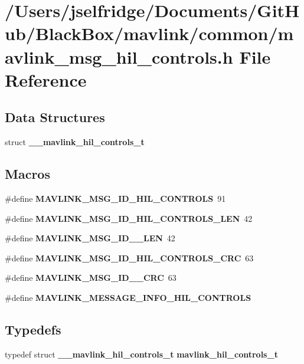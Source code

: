 \section{/\+Users/jselfridge/\+Documents/\+Git\+Hub/\+Black\+Box/mavlink/common/mavlink\+\_\+msg\+\_\+hil\+\_\+controls.h File Reference}
\label{mavlink__msg__hil__controls_8h}
\subsection*{Data Structures}
\begin{DoxyCompactItemize}
\item 
struct \textbf{ \+\_\+\+\_\+mavlink\+\_\+hil\+\_\+controls\+\_\+t}
\end{DoxyCompactItemize}
\subsection*{Macros}
\begin{DoxyCompactItemize}
\item 
\#define \textbf{ M\+A\+V\+L\+I\+N\+K\+\_\+\+M\+S\+G\+\_\+\+I\+D\+\_\+\+H\+I\+L\+\_\+\+C\+O\+N\+T\+R\+O\+LS}~91
\item 
\#define \textbf{ M\+A\+V\+L\+I\+N\+K\+\_\+\+M\+S\+G\+\_\+\+I\+D\+\_\+\+H\+I\+L\+\_\+\+C\+O\+N\+T\+R\+O\+L\+S\+\_\+\+L\+EN}~42
\item 
\#define \textbf{ M\+A\+V\+L\+I\+N\+K\+\_\+\+M\+S\+G\+\_\+\+I\+D\+\_\+\_\+\+L\+EN}~42
\item 
\#define \textbf{ M\+A\+V\+L\+I\+N\+K\+\_\+\+M\+S\+G\+\_\+\+I\+D\+\_\+\+H\+I\+L\+\_\+\+C\+O\+N\+T\+R\+O\+L\+S\+\_\+\+C\+RC}~63
\item 
\#define \textbf{ M\+A\+V\+L\+I\+N\+K\+\_\+\+M\+S\+G\+\_\+\+I\+D\+\_\+\_\+\+C\+RC}~63
\item 
\#define \textbf{ M\+A\+V\+L\+I\+N\+K\+\_\+\+M\+E\+S\+S\+A\+G\+E\+\_\+\+I\+N\+F\+O\+\_\+\+H\+I\+L\+\_\+\+C\+O\+N\+T\+R\+O\+LS}
\end{DoxyCompactItemize}
\subsection*{Typedefs}
\begin{DoxyCompactItemize}
\item 
typedef struct \textbf{ \+\_\+\+\_\+mavlink\+\_\+hil\+\_\+controls\+\_\+t} \textbf{ mavlink\+\_\+hil\+\_\+controls\+\_\+t}
\end{DoxyCompactItemize}


